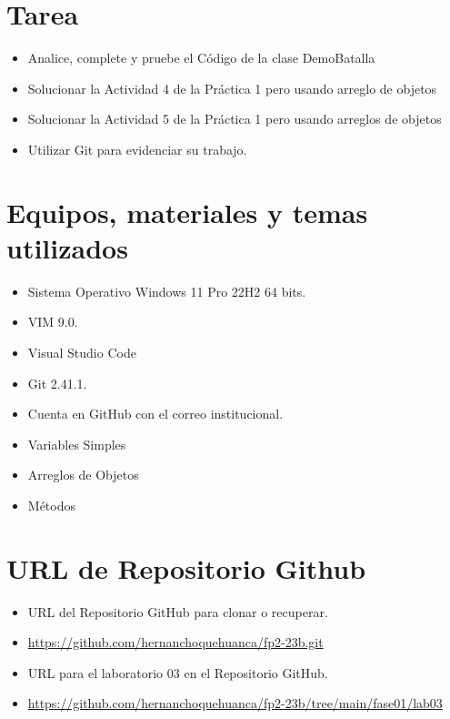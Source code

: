 \documentclass{article}
\begin{document}

	\section{Tarea}
	\begin{itemize}		
		\item Analice, complete y pruebe el Código de la clase DemoBatalla 
        \item Solucionar la Actividad 4 de la Práctica 1 pero usando arreglo de objetos
        \item Solucionar la Actividad 5 de la Práctica 1 pero usando arreglos de objetos
        
		\item Utilizar Git para evidenciar su trabajo.

	\end{itemize}
		
	\section{Equipos, materiales y temas utilizados}
	\begin{itemize}
		\item Sistema Operativo Windows 11 Pro 22H2 64 bits.
		\item VIM 9.0.
		\item Visual Studio Code
		\item Git 2.41.1.
		\item Cuenta en GitHub con el correo institucional.
            \item Variables Simples
		\item Arreglos de Objetos
        \item Métodos
	\end{itemize}
	
	\section{URL de Repositorio Github}
	\begin{itemize}
		\item URL del Repositorio GitHub para clonar o recuperar.
        \item \url{https://github.com/hernanchoquehuanca/fp2-23b.git}
		\item URL para el laboratorio 03 en el Repositorio GitHub.
		\item \url{https://github.com/hernanchoquehuanca/fp2-23b/tree/main/fase01/lab03}
	\end{itemize}
	
\end{document}
